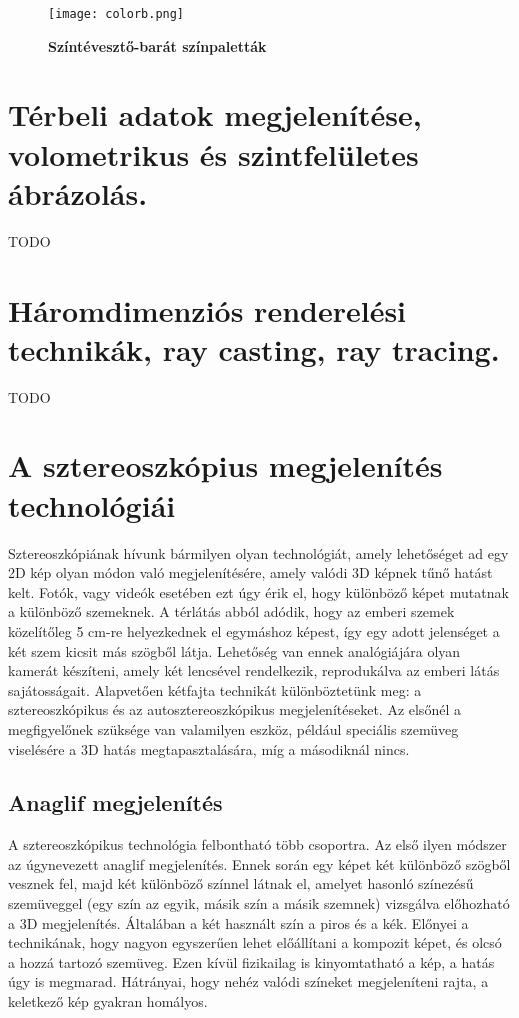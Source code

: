 \documentclass[12pt]{extarticle}
\begin{document}
 \begin{figure}[H]
    \centering
    \texttt{[image: colorb.png]}
    \caption{\textbf{Színtévesztő-barát színpaletták}}
    \label{fig:GeneralDiagram}
 \end{figure}
 
 \newline

 \section{Térbeli adatok megjelenítése, volometrikus és szintfelületes ábrázolás.}
 TODO
 
 \section{Háromdimenziós renderelési technikák, ray casting, ray tracing.}
 TODO
 
 

 
  
\section{A sztereoszkópius megjelenítés technológiái}

Sztereoszkópiának hívunk bármilyen olyan technológiát, amely lehetőséget ad egy 2D kép olyan módon való megjelenítésére, amely valódi 3D képnek tűnő hatást kelt. Fotók, vagy videók esetében ezt úgy érik el, hogy különböző képet mutatnak a különböző szemeknek. \newline
A térlátás abból adódik, hogy az emberi szemek közelítőleg 5 cm-re helyezkednek el egymáshoz képest, így egy adott jelenséget a két szem kicsit más szögből látja. Lehetőség van ennek analógiájára olyan kamerát készíteni, amely két lencsével rendelkezik, reprodukálva az emberi látás sajátosságait. Alapvetően kétfajta technikát különböztetünk meg: a sztereoszkópikus és az autosztereoszkópikus megjelenítéseket. Az elsőnél a megfigyelőnek szüksége van valamilyen eszköz, például speciális szemüveg viselésére a 3D hatás megtapasztalására, míg a másodiknál nincs. \newline
\subsection{Anaglif megjelenítés}
A sztereoszkópikus technológia felbontható több csoportra. Az első ilyen módszer az úgynevezett anaglif megjelenítés. Ennek során egy képet két különböző szögből vesznek fel, majd két különböző színnel látnak el, amelyet hasonló színezésű szemüveggel (egy szín az egyik, másik szín a másik szemnek) vizsgálva előhozható a 3D megjelenítés. Általában a két használt szín a piros és a kék. Előnyei a technikának, hogy nagyon egyszerűen lehet előállítani a kompozit képet, és olcsó a hozzá tartozó szemüveg. Ezen kívül fizikailag is kinyomtatható a kép, a hatás úgy is megmarad. Hátrányai, hogy nehéz valódi színeket megjeleníteni rajta, a keletkező kép gyakran homályos.
\end{document}
